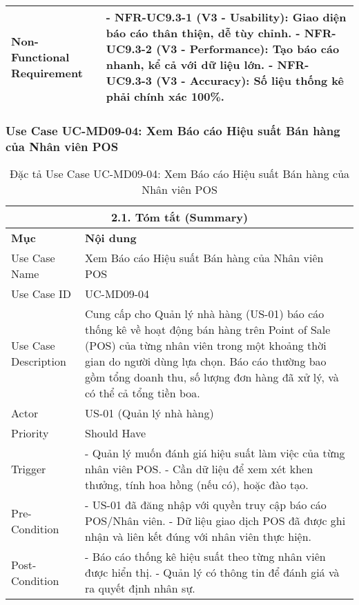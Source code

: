 \begin{longtable}{|m{4cm}|p{11cm}|}
\hline
Non-Functional Requirement & - \textbf{NFR-UC9.3-1 (V3 - Usability):} Giao diện báo cáo thân thiện, dễ tùy chỉnh. \newline - \textbf{NFR-UC9.3-2 (V3 - Performance):} Tạo báo cáo nhanh, kể cả với dữ liệu lớn. \newline - \textbf{NFR-UC9.3-3 (V3 - Accuracy):} Số liệu thống kê phải chính xác 100\%. \\
\hline
\end{longtable}

\subsubsection{Use Case UC-MD09-04: Xem Báo cáo Hiệu suất Bán hàng của Nhân viên POS}
\begin{longtable}{|m{4cm}|p{11cm}|}
\caption{Đặc tả Use Case UC-MD09-04: Xem Báo cáo Hiệu suất Bán hàng của Nhân viên POS} \label{tab:uc_md09_04_corrected} \\
\hline
\multicolumn{2}{|c|}{\textbf{2.1. Tóm tắt (Summary)}} \\
\hline
\textbf{Mục} & \textbf{Nội dung} \\
\hline
\endhead %
\midrule
\endfoot %
\bottomrule
\endlastfoot %
Use Case Name & Xem Báo cáo Hiệu suất Bán hàng của Nhân viên POS \\
\hline
Use Case ID & UC-MD09-04 \\
\hline
Use Case Description & Cung cấp cho Quản lý nhà hàng (US-01) báo cáo thống kê về hoạt động bán hàng trên Point of Sale (POS) của từng nhân viên trong một khoảng thời gian do người dùng lựa chọn. Báo cáo thường bao gồm tổng doanh thu, số lượng đơn hàng đã xử lý, và có thể cả tổng tiền boa. \\
\hline
Actor & US-01 (Quản lý nhà hàng) \\
\hline
Priority & Should Have \\
\hline
Trigger & - Quản lý muốn đánh giá hiệu suất làm việc của từng nhân viên POS. \newline - Cần dữ liệu để xem xét khen thưởng, tính hoa hồng (nếu có), hoặc đào tạo. \\
\hline
Pre-Condition & - US-01 đã đăng nhập với quyền truy cập báo cáo POS/Nhân viên. \newline - Dữ liệu giao dịch POS đã được ghi nhận và liên kết đúng với nhân viên thực hiện. \\
\hline
Post-Condition & - Báo cáo thống kê hiệu suất theo từng nhân viên được hiển thị. \newline - Quản lý có thông tin để đánh giá và ra quyết định nhân sự. \\

\end{longtable}
